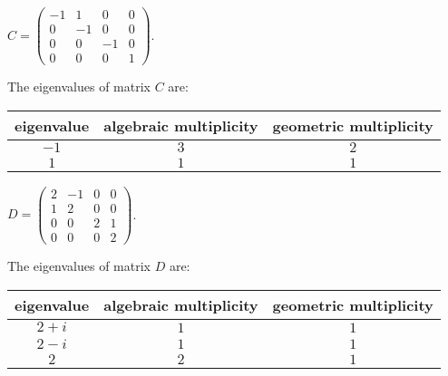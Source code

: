 \documentclass{ximera}
\begin{document}
\begin{exercise} \label{c10.5.1c}
$C = \left(\begin{array}{rrrr} -1 & 1 &  0 & 0\\ 0 & -1 & 0 & 0 \\
0 & 0 & -1 & 0 \\ 0 & 0 & 0 & 1 \end{array}\right)$.

\begin{solution}
The eigenvalues of matrix $C$ are:
\begin{center}
\begin{tabular}{|c|c|c|}
\hline
eigenvalue & algebraic multiplicity & geometric multiplicity \\
\hline
$-1$ & $3$ & $2$ \\
$1$ & $1$ & $1$ \\
\hline
\end{tabular}
\end{center}

\end{solution}
\end{exercise}
\begin{exercise} \label{c10.5.1d}
$D = \left(\begin{array}{rrrr} 2 & -1 &  0 & 0\\ 1 & 2 & 0 & 0 \\
0 & 0 & 2 & 1 \\ 0 & 0 & 0 & 2 \end{array}\right)$.

\begin{solution}
The eigenvalues of matrix $D$ are:
\begin{center}
\begin{tabular}{|c|c|c|}
\hline
eigenvalue & algebraic multiplicity & geometric multiplicity \\
\hline
$2 + i$ & $1$ & $1$ \\
$2 - i$ & $1$ & $1$ \\
$2$ & $2$ & $1$ \\
\hline
\end{tabular}
\end{center}

\end{solution}
\end{exercise}
\end{document}
